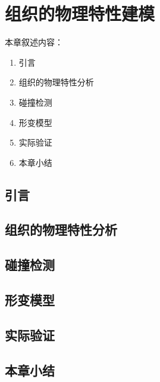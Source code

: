 \chapter{组织的物理特性建模}
\label{chap7}

本章叙述内容：
\begin{enumerate}
  \item 引言
  \item 组织的物理特性分析
  \item 碰撞检测
  \item 形变模型
  \item 实际验证
  \item 本章小结
\end{enumerate}

\section{引言}

\section{组织的物理特性分析}

\section{碰撞检测}

\section{形变模型}

\section{实际验证}

\section{本章小结}